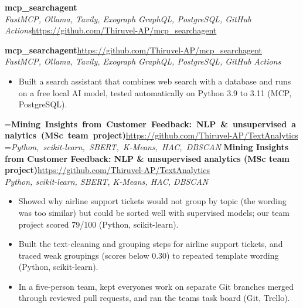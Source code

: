 \documentclass[a4paper,11pt]{article}
\newcommand{\project}[3]{%
  \textbf{#1}\hfill#3\\ {\color{muted}\small\textit{#2}}\par}
\newcommand{\gap}{\vspace{5pt}}
\begin{document}
\else
\textbf{mcp\_searchagent}\\ {\color{muted}\small\textit{FastMCP, Ollama, Tavily, Exograph GraphQL, PostgreSQL, GitHub Actions}}\hfill{\small\url{https://github.com/Thiruvel-AP/mcp_searchagent}}\par
\fi
\else
\project{mcp\_searchagent}{FastMCP, Ollama, Tavily, Exograph GraphQL, PostgreSQL, GitHub Actions}{\url{https://github.com/Thiruvel-AP/mcp_searchagent}}
\fi
\begin{itemize}
  \item Built a search assistant that combines web search with a database and runs on a free local AI model, tested automatically on Python 3.9 to 3.11 (MCP, PostgreSQL).
\end{itemize}
\gap
{}
=\hbox{\textbf{Mining Insights from Customer Feedback: NLP \& unsupervised analytics (MSc team project)}\hspace{1em}\url{https://github.com/Thiruvel-AP/TextAnalytics}}%
=\hbox{{\small\textit{Python, scikit-learn, SBERT, K-Means, HAC, DBSCAN}}}%
\ifdim\wd0>\linewidth
\ifdim\wd2>\linewidth
\textbf{Mining Insights from Customer Feedback: NLP \& unsupervised analytics (MSc team project)}\\ {\color{muted}\small\textit{Python, scikit-learn, SBERT, K-Means, HAC, DBSCAN}}\\ \hspace*{\fill}{\small\url{https://github.com/Thiruvel-AP/TextAnalytics}}\par
\else
\textbf{Mining Insights from Customer Feedback: NLP \& unsupervised analytics (MSc team project)}\\ {\color{muted}\small\textit{Python, scikit-learn, SBERT, K-Means, HAC, DBSCAN}}\hfill{\small\url{https://github.com/Thiruvel-AP/TextAnalytics}}\par
\fi
\else
\project{Mining Insights from Customer Feedback: NLP \& unsupervised analytics (MSc team project)}{Python, scikit-learn, SBERT, K-Means, HAC, DBSCAN}{\url{https://github.com/Thiruvel-AP/TextAnalytics}}
\fi
\begin{itemize}
  \item Showed why airline support tickets would not group by topic (the wording was too similar) but could be sorted well with supervised models; our team project scored 79/100 (Python, scikit-learn).
  \item Built the text-cleaning and grouping steps for airline support tickets, and traced weak groupings (scores below 0.30) to repeated template wording (Python, scikit-learn).
  \item In a five-person team, kept everyone\textquotesingle{}s work on separate Git branches merged through reviewed pull requests, and ran the team\textquotesingle{}s task board (Git, Trello).
\end{itemize}
\end{document}
